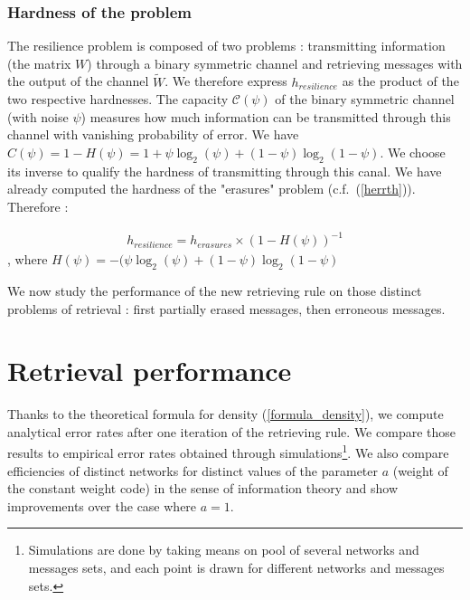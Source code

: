 \documentclass[english,10pt,twocolumn]{IEEEtran}
\theoremstyle{definition}
\begin{document}
			
	\subsubsection{Hardness of the problem}
	
	The resilience problem is composed of two problems : transmitting information (the matrix $W$) through a binary symmetric channel and retrieving messages with the output of the channel $\tilde{W}$. We therefore express $h_{resilience}$ as the product of the two respective hardnesses. The capacity $\mathcal{C}(\psi)$ of the binary symmetric channel (with noise $\psi$) measures how much information can be transmitted through this channel with vanishing probability of error. We have $C(\psi) = 1 - H(\psi) = 1 + \psi \log_2 (\psi) + (1-\psi) \log_2 (1-\psi)$. We choose its inverse to qualify the hardness of transmitting through this canal. We have already computed the hardness of the "erasures" problem (c.f.~(\ref{herrth})). Therefore :
	
	\begin{align}
		h_{resilience} = h_{erasures} \times \left( 1 - H(\psi) \right)^{-1}
	\end{align}	
	, where $H(\psi) = -(\psi \log_2 (\psi) + (1-\psi) \log_2 (1-\psi)$
	
	\vspace*{1mm}We now study the performance of the new retrieving rule on those distinct problems of retrieval : first partially erased messages, then erroneous messages.%
		
	\section{Retrieval performance}	
	
	Thanks to the theoretical formula for density (\ref{formula_density}), we compute analytical error rates after one iteration of the retrieving rule. We compare those results to empirical error rates obtained through simulations\footnote{Simulations are done by taking means on pool of several networks and messages sets, and each point is drawn for different networks and messages sets.}. We also compare efficiencies of distinct networks for distinct values of the parameter $a$ (weight of the constant weight code) in the sense of information theory and show improvements over the case where $a = 1$.
	
\end{document}
